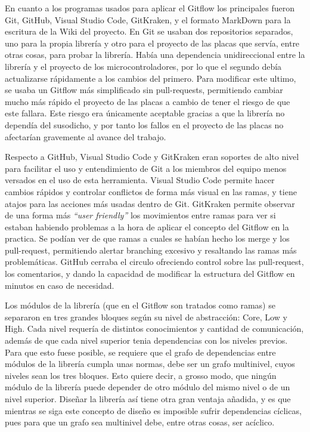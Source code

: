 \documentclass{report}
\begin{document}
En cuanto a los programas usados para aplicar el Gitflow los principales fueron Git, GitHub, Visual Studio Code, GitKraken, y el formato MarkDown para la escritura de la Wiki del proyecto. En Git se usaban dos repositorios separados, uno para la propia librería y otro para el proyecto de las placas que servía, entre otras cosas, para probar la librería. Había una dependencia unidireccional entre la librería y el proyecto de los microcontroladores, por lo que el segundo debía actualizarse rápidamente a los cambios del primero. Para modificar este ultimo, se usaba un Gitflow más simplificado sin pull-requests, permitiendo cambiar mucho más rápido el proyecto de las placas a cambio de tener el riesgo de que este fallara. Este riesgo era únicamente aceptable gracias a que la librería no dependía del susodicho, y por tanto los fallos en el proyecto de las placas no afectarían gravemente al avance del trabajo. \par
Respecto a GitHub, Visual Studio Code y GitKraken eran soportes de alto nivel para facilitar el uso y entendimiento de Git a los miembros del equipo menos versados en el uso de esta herramienta. Visual Studio Code permite hacer cambios rápidos y controlar conflictos de forma más visual en las ramas, y tiene atajos para las acciones más usadas dentro de Git. GitKraken permite observar de una forma más \textit{``user friendly''} los movimientos entre ramas para ver si estaban habiendo problemas a la hora de aplicar el concepto del Gitflow en la practica. Se podían ver de que ramas a cuales se habían hecho los merge y los pull-request, permitiendo alertar branching excesivo y resaltando las ramas más problemáticas. GitHub cerraba el circulo ofreciendo control sobre las pull-request, los comentarios, y dando la capacidad de modificar la estructura del Gitflow en minutos en caso de necesidad.
\par \vspace{0.3 cm}
Los módulos de la librería (que en el Gitflow son tratados como ramas) se separaron en tres grandes bloques según su nivel de abstracción: Core, Low y High. Cada nivel requería de distintos conocimientos y cantidad de comunicación, además de que cada nivel superior tenia dependencias con los niveles previos. Para que esto fuese posible, se requiere que el grafo de dependencias entre módulos de la librería cumpla unas normas, debe ser un grafo multinivel, cuyos niveles sean los tres bloques. Esto quiere decir, a grosso modo, que ningún módulo de la librería puede depender de otro módulo del mismo nivel o de un nivel superior. Diseñar la librería así tiene otra gran ventaja añadida, y es que mientras se siga este concepto de diseño es imposible sufrir dependencias cíclicas, pues para que un grafo sea multinivel debe, entre otras cosas, ser acíclico. \par
\end{document}
